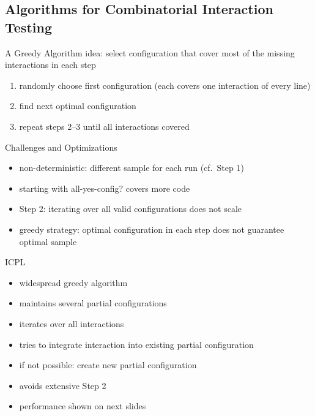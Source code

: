 \subsection{Algorithms for Combinatorial Interaction Testing}
\begin{frame}{\myframetitle}
	\begin{mycolumns}[widths={63}]
		\begin{definition}{A Greedy Algorithm}
			idea: select configuration that cover most of the missing interactions in each step
			\begin{enumerate}
				\item randomly choose first configuration (each covers one interaction of every line)
				\item find next optimal configuration
				\item repeat steps 2--3 until all interactions covered
			\end{enumerate}
		\end{definition}
		\pause
		\begin{note}{Challenges and Optimizations}
			\begin{itemize}
				\item non-deterministic: different sample for each run (cf.\ Step 1)
				\item starting with all-yes-config? covers more code
				\item Step 2: iterating over all valid configurations does not scale
				\item greedy strategy: optimal configuration in each step does not guarantee optimal sample
			\end{itemize}
		\end{note}
	\mynextcolumn
		\pause
		\begin{definition}{ICPL\mysource{\icpl}}
			\begin{itemize}
				\item widespread greedy algorithm
				\item maintains several partial configurations
				\item iterates over all interactions
				\item tries to integrate interaction into existing partial configuration
				\item if not possible: create new partial configuration
				\item avoids extensive Step 2
				\item performance shown on next slides
			\end{itemize}
		\end{definition}
	\end{mycolumns}
\end{frame}

